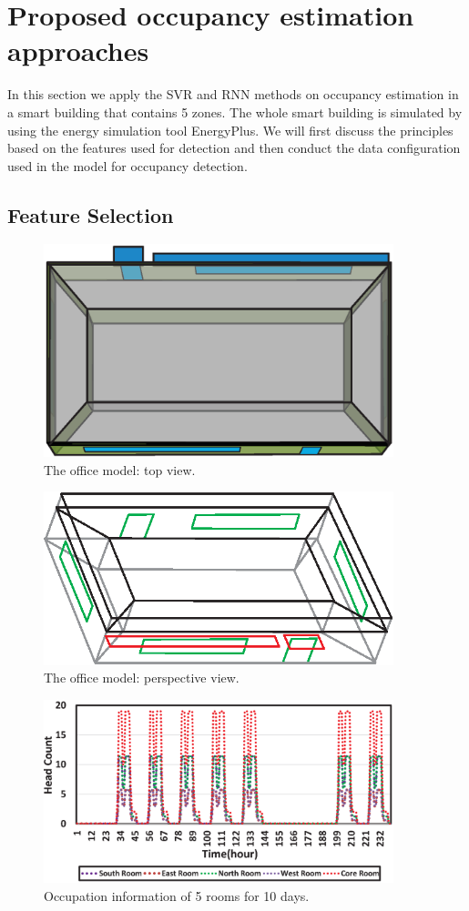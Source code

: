 \section{Proposed occupancy estimation approaches}
\label{sec:proposed_methods}
In this section we apply the SVR and RNN methods on occupancy estimation in a
smart building that contains 5 zones. The whole smart building is simulated by
using the energy simulation tool EnergyPlus. We will first discuss the
principles based on the features used for detection and then conduct the data
configuration used in the model for occupancy detection.
\subsection{Feature Selection}
\label{sec:feature_selection}
\begin{figure}[h]
\centering
\includegraphics[width=4in]{./Pics/TopView2.eps}
\caption{The office model: top view.}
\label{fig:office1}
\end{figure}

\begin{figure}[h]
\centering
\includegraphics[width=4in]{./Pics/SideView.eps}
\caption{The office model: perspective view.}
\label{fig:office2}
\end{figure}

\begin{figure}[h]
\centering
\includegraphics[width=4in]{./Pics/Headcount.eps}
\caption{Occupation information of 5 rooms for 10 days.}
\label{fig:Headcount}
\end{figure}

